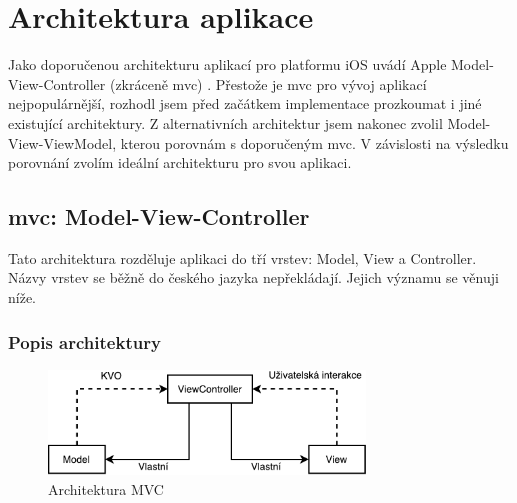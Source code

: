 \section{Architektura aplikace}\label{analyza-architektura}

Jako doporučenou architekturu aplikací pro platformu iOS uvádí Apple Model-View-Controller (zkráceně \acrshort{mvc}) \cite{gc-apple-recommends}.
Přestože je \acrshort{mvc} pro vývoj aplikací nejpopulárnější, rozhodl jsem před začátkem implementace prozkoumat i jiné existující architektury.
Z alternativních architektur jsem nakonec zvolil Model-View-ViewModel, kterou porovnám s doporučeným \acrshort{mvc}.
V závislosti na výsledku porovnání zvolím ideální architekturu pro svou aplikaci.

\subsection{\acrshort{mvc}: Model-View-Controller}\label{analyza-mvc}
Tato architektura rozděluje aplikaci do tří vrstev: Model, View a Controller.
Názvy vrstev se běžně do českého jazyka nepřekládají.
Jejich významu se věnuji níže.

\subsubsection*{Popis architektury}

\begin{figure}\centering
	\includegraphics[width=0.75\textwidth]{assets/analysis-mvc-architecture.pdf}
	\caption{Architektura MVC}\label{fig:architektura-mvc}
\end{figure}

